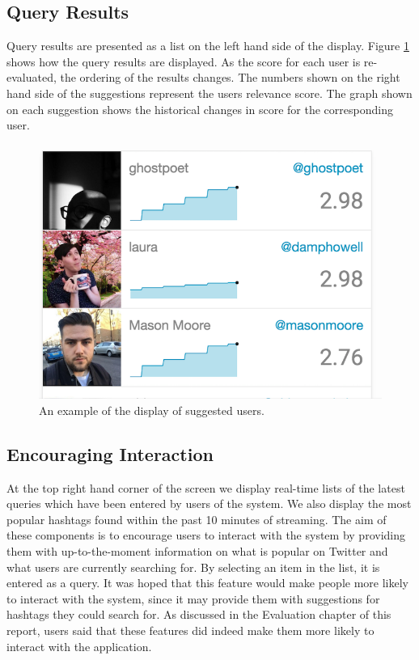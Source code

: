 \documentclass{l4proj}
\begin{document}
        \subsection{Query Results}
        Query results are presented as a list on the left hand side of the display. Figure \ref{queryresults} shows how the query results are displayed. As the score for each user is re-evaluated, the ordering of the results changes. The numbers shown on the right hand side of the suggestions represent the users relevance score. The graph shown on each suggestion shows the historical changes in score for the corresponding user.
        
\begin{figure}[H]
\centering
\includegraphics[scale=0.9]{queryresults.png}
\caption{An example of the display of suggested users.}
\label{queryresults}
\end{figure} 
        
        \subsection{Encouraging Interaction}
        At the top right hand corner of the screen we display real-time lists of the latest queries which have been entered by users of the system. We also display the most popular hashtags found within the past 10 minutes of streaming. The aim of these components is to encourage users to interact with the system by providing them with up-to-the-moment information on what is popular on Twitter and what users are currently searching for. By selecting an item in the list, it is entered as a query. It was hoped that this feature would make people more likely to interact with the system, since it may provide them with suggestions for hashtags they could search for. As discussed in the Evaluation chapter of this report, users said that these features did indeed make them more likely to interact with the application.
        
\end{document}
